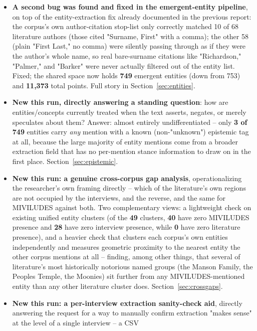 \documentclass[11pt,a4paper]{article}
\begin{document}
\begin{itemize}[leftmargin=1.4em]
  \item \textbf{A second bug was found and fixed in the emergent-entity
  pipeline}, on top of the entity-extraction fix already documented in
  the previous report: the corpus's own author-citation stop-list only
  correctly matched 10 of 68 literature authors (those cited
  "Surname, First" with a comma); the other 58 (plain "First Last," no
  comma) were silently passing through as if they were the author's
  whole name, so real bare-surname citations like "Richardson,"
  "Palmer," and "Barker" were never actually filtered out of the entity
  list. Fixed; the shared space now holds \textbf{749} emergent entities
  (down from 753) and \textbf{11{,}373} total points. Full story in
  Section~\ref{sec:entities}.
  \item \textbf{New this run, directly answering a standing question}:
  how are entities/concepts currently treated when the text asserts,
  negates, or merely speculates about them? Answer: almost entirely
  undifferentiated -- only \textbf{3 of 749} entities carry \emph{any}
  mention with a known (non-"unknown") epistemic tag at all, because the
  large majority of entity mentions come from a broader extraction field
  that has no per-mention stance information to draw on in the first
  place. Section~\ref{sec:epistemic}.
  \item \textbf{New this run: a genuine cross-corpus gap analysis},
  operationalizing the researcher's own framing directly -- which of the
  literature's own regions are not occupied by the interviews, and the
  reverse, and the same for MIVILUDES against both. Two complementary
  views: a lightweight check on existing unified entity clusters (of the
  \textbf{49} clusters, \textbf{40} have zero MIVILUDES presence and
  \textbf{28} have zero interview presence, while \textbf{0} have zero
  literature presence), and a heavier check that clusters each corpus's
  own entities independently and measures geometric proximity to the
  nearest entity the other corpus mentions at all -- finding, among other
  things, that several of literature's most historically notorious named
  groups (the Manson Family, the Peoples Temple, the Moonies) sit
  further from any MIVILUDES-mentioned entity than any other literature
  cluster does. Section~\ref{sec:crossgaps}.
  \item \textbf{New this run: a per-interview extraction sanity-check
  aid}, directly answering the request for a way to manually confirm
  extraction "makes sense" at the level of a single interview -- a CSV

\end{itemize}
\end{document}
